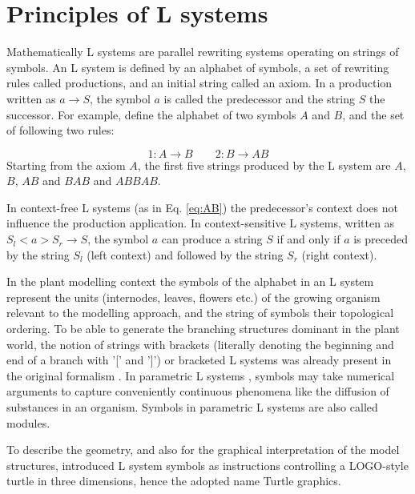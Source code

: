 \section{Principles of L systems}

Mathematically L  systems are parallel rewriting  systems operating on
strings of symbols. An L system  is defined by an alphabet of symbols,
a set  of rewriting  rules called productions,  and an  initial string
called an  axiom. In  a production written  as $a \rightarrow  S$, the
symbol $a$ is called the predecessor and the string $S$ the successor.
For example, define  the alphabet of two symbols $A$  and $B$, and the
set of following two rules:

\begin{equation}\label{eq:AB}
1: A \rightarrow B \qquad 2: B \rightarrow AB 
\end{equation}
Starting from the axiom $A$, the  first five strings produced by the L
system are $A$, $B$, $AB$ and $BAB$ and $ABBAB$.

In context-free  L systems (as in Eq.   \ref{eq:AB}) the predecessor's
context   does   not  influence   the   production  application.    In
context-sensitive L systems, written as $S_l < a > S_r \rightarrow S$,
the symbol $a$ can produce a string $S$ if and only if $a$ is preceded
by the  string $S_l$ (left context)  and followed by  the string $S_r$
(right context).

In the  plant modelling context  the symbols of  the alphabet in  an L
system represent the units  (internodes, leaves, flowers etc.)  of the
growing organism relevant to the modelling approach, and the string of
symbols  their  topological ordering.   To  be  able  to generate  the
branching  structures  dominant in  the  plant  world,  the notion  of
strings with brackets  (literally denoting the beginning and  end of a
branch with '[' and ']') or bracketed L systems was already present in
the  original  formalism   \citep{lindenmayer:68}.   In  parametric  L
systems  \citep{pp:90a},  symbols  may  take  numerical  arguments  to
capture  conveniently  continuous  phenomena  like  the  diffusion  of
substances in an  organism.  Symbols in parametric L  systems are also
called modules.

To describe the geometry, and also for the graphical interpretation of
the  model structures,  \citet{pp:86} introduced  L system  symbols as
instructions  controlling a  LOGO-style  turtle \citep{abelson:82}  in
three dimensions, hence the adopted name Turtle graphics.

